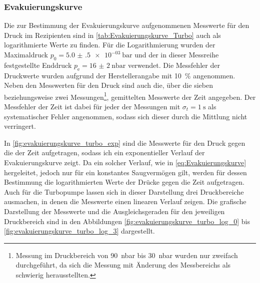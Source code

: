 \subsubsection{Evakuierungskurve}
Die zur Bestimmung der Evakuierungskurve aufgenommenen Messwerte für den Druck
im Rezipienten sind in \cref{tab:Evakuierungskurve_Turbo} auch als logarithmierte
Werte zu finden. Für die Logarithmierung wurden der Maximaldruck $p_{0} =\SI{5.0(5)e-03}{\bar} $
und der in dieser Messreihe festgestellte Enddruck $p_{\mathrm{e}} =\SI{16(2)}{\nano\bar}$ verwendet.
Die Messfehler der Druckwerte wurden aufgrund der Herstellerangabe \cite{DatenblattV70} mit \SI{10}{\percent} angenommen.
Neben den Messwerten für den Druck sind auch die, über die sieben beziehungsweise zwei Messungen\footnote{
Messung im Druckbereich von \SI{90}{\nano\bar} bis \SI{30}{\nano\bar} wurden nur zweifach durchgeführt,
da sich die Messung mit Änderung des Messbereichs als schwierig herausstellten.}, 
gemittelten Messwerte der Zeit angegeben. Der Messfehler der Zeit ist dabei für jeder der Messungen mit
$\sigma_{t} = \SI{1}{\s}$ als systematischer Fehler angenommen, sodass sich dieser durch die Mittlung nicht verringert.


In \cref{fig:evakuierungskurve_turbo_exp} sind die Messwerte für den Druck gegen die der Zeit aufgetragen,
sodass ich ein exponentieller Verlauf der Evakuierungskurve zeigt. Da ein solcher Verlauf, wie in 
\eqref{eq:Evakuierungskurve} hergeleitet, jedoch nur für ein konstantes Saugvermögen gilt, werden für dessen Bestimmung die logarithmierten Werte der Drücke gegen die Zeit aufgetragen.
Auch für die Turbopumpe lassen sich in dieser Darstellung drei Druckbereiche ausmachen,
in denen die Messwerte einen linearen Verlauf zeigen. Die grafische Darstellung der Messwerte und die 
Ausgleichsgeraden für den jeweiligen Druckbereich sind in den Abbildungen \ref{fig:evakuierungskurve_turbo_log_0} 
bis \ref{fig:evakuierungskurve_turbo_log_3} dargestellt.\\

{%

\FloatBarrier}

{%

\FloatBarrier

\FloatBarrier

\FloatBarrier

\FloatBarrier}

